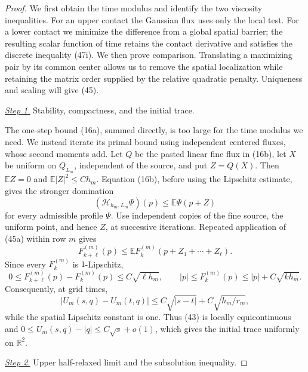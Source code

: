 \documentclass{aomart}
\theoremstyle{definition}
\newcommand{\1}{\mathbf 1}
\begin{document}
\begin{proof}
We first obtain the time modulus and identify the two viscosity
inequalities.  For an upper contact the Gaussian flux uses only the
local test.  For a lower contact we minimize the difference from a
global spatial barrier; the resulting scalar function of time retains
the contact derivative and satisfies the discrete inequality (47i).
We then prove comparison.  Translating a maximizing pair by its
common center allows us to remove the spatial localization while
retaining the matrix order supplied by the relative quadratic
penalty.  Uniqueness and scaling will give (45).

\smallskip\noindent
\underline{\textit{Step 1.}} Stability, compactness, and the initial trace.

The one-step bound (16a), summed directly, is too large for the time
modulus we need.  We instead iterate its primal bound using
independent centered fluxes, whose second moments add.
Let $Q$ be the pasted linear fine flux in (16b), let $X$ be uniform
on $Q_{L_m}$, independent of the source, and put $Z=Q(X)$.  Then
$\mathbb EZ=0$ and
$\mathbb E|Z|^2\leq Ch_ m$.  Equation (16b), before using the
Lipschitz estimate, gives the stronger domination
\begin{equation}
(\mathcal H_ {h_ m,L_ m}\Psi)(p)\leq\mathbb E\Psi(p+Z)
\tag{45a}
\end{equation}
for every admissible profile $\Psi$.  Use independent copies of the
fine source, the uniform point, and hence $Z$, at successive
iterations.  Repeated application of (45a) within row $m$ gives
\begin{equation*}
F_{k+\ell}^{(m)}(p)
\leq\mathbb E F_k^{(m)}(p+Z_ 1+\cdots+Z_ \ell).
\end{equation*}
Since every $F_k^{(m)}$ is $1$-Lipschitz,
\begin{equation}
0\leq F_{k+\ell}^{(m)}(p)-F_k^{(m)}(p)\leq C\sqrt{\ell h_m},
\qquad |p|\leq F_k^{(m)}(p)\leq|p|+C\sqrt{k h_m}.
\tag{46}
\end{equation}
Consequently, at grid times,
\begin{equation}
|U_ m(s,q)-U_ m(t,q)|
\leq C\sqrt{|s-t|}+C\sqrt{h_ m/r_ m},
\tag{46a}
\end{equation}
while the spatial Lipschitz constant is one.  Thus (43) is locally
equicontinuous and
$0\leq U_ m(s,q)-|q|\leq C\sqrt s+o(1)$, which gives the initial
trace uniformly on $\mathbb R^2$.

\smallskip\noindent
\underline{\textit{Step 2.}} Upper half-relaxed limit and the subsolution inequality.


\end{proof}
\end{document}
